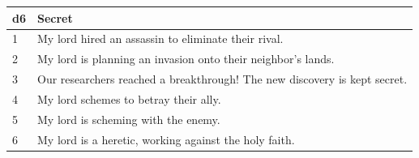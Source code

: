 \noindent
\begin{tabular}{p{0.5cm} p{7cm}}
	\color{black} d6 & \color{black} Secret \\ \hline
	
	\color{black} 1 & \color{black} My lord hired an assassin to eliminate their rival. \\
	
	\color{black} 2 & \color{black} My lord is planning an invasion onto their neighbor's lands. \\
	
	\color{black} 3 & \color{black} Our researchers reached a breakthrough! The new discovery is kept secret. \\
	
	\color{black} 4 & \color{black} My lord schemes to betray their ally. \\
	
	\color{black} 5 & \color{black} My lord is scheming with the enemy. \\
	
	\color{black} 6 & \color{black} My lord is a heretic, working against the holy faith. \\
\end{tabular}